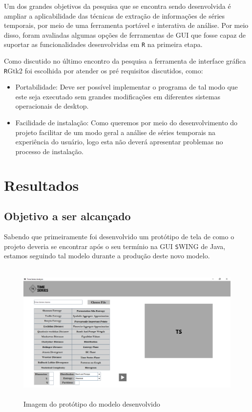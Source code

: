 \documentclass[12pt,letterpaper]{article}
\begin{document}
Um dos grandes objetivos da pesquisa que se encontra sendo desenvolvida é ampliar a aplicabilidade das técnicas de extração de informações de séries temporais, por meio de uma ferramenta portável e interativa de análise. Por meio disso, foram avaliadas algumas opções de ferramentas de GUI que fosse capaz de suportar as funcionalidades desenvolvidas em \texttt R na primeira etapa.

Como discutido no último encontro da pesquisa a ferramenta de interface gráfica \texttt RGtk2 foi escolhida por atender os pré requisitos discutidos, como:

\begin{itemize}
\item Portabilidade: Deve ser possível implementar o programa de tal modo que este seja executado sem grandes modificações em diferentes sistemas operacionais de desktop.
\item Facilidade de instalação: Como queremos por meio do desenvolvimento do projeto facilitar de um modo geral a análise de séries temporais na experiência do usuário, logo esta não deverá apresentar problemas no processo de instalação.
\end{itemize}

\section{Resultados}

\subsection{Objetivo a ser alcançado}

Sabendo que primeiramente foi desenvolvido um protótipo de tela de como o projeto deveria se encontrar após o seu termínio na GUI \texttt SWING de Java, estamos seguindo tal modelo durante a produção deste novo modelo.

\begin{figure}
  \centering
  \caption{Imagem do protótipo do modelo desenvolvido}
   \includegraphics[width=15cm,height=7cm]{tela4.png}
\end{figure}
\end{document}
